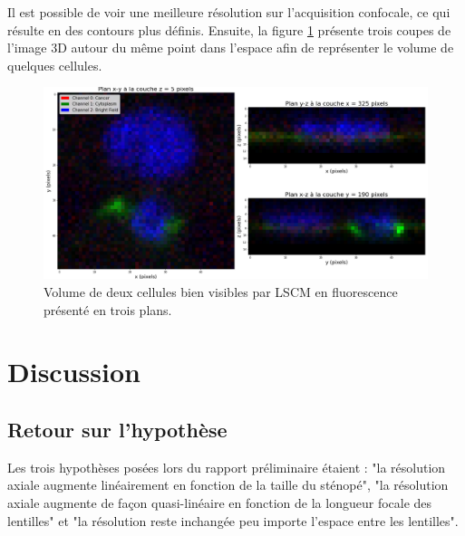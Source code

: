 \documentclass[11pt,letterpaper]{article}
\begin{document}
Il est possible de voir une meilleure résolution sur l'acquisition confocale, ce qui résulte en des contours plus définis. Ensuite, la figure \ref{3d_cells} présente trois coupes de l'image 3D autour du même point dans l'espace afin de
représenter le volume de quelques cellules.

\begin{figure}[H]
  \centering
  \includegraphics[scale=0.34]{volume.png}
  \caption{Volume de deux cellules bien visibles par LSCM en fluorescence présenté en trois plans.}
  \label{3d_cells}
\end{figure}


\section{Discussion}

\subsection{Retour sur l'hypothèse}

Les trois hypothèses posées lors du rapport préliminaire étaient : "la résolution axiale augmente linéairement en fonction de la taille du sténopé", "la résolution axiale augmente de façon quasi-linéaire en fonction de la longueur focale des lentilles" et "la résolution reste inchangée peu importe l'espace entre les lentilles". \\
\end{document}
